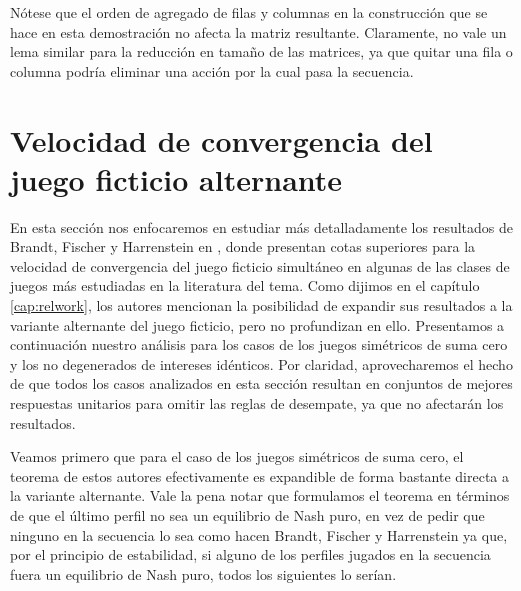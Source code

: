 Nótese que el orden de agregado de filas y columnas en la construcción que se hace en esta demostración no afecta la matriz resultante. Claramente, no vale un lema similar para la reducción en tamaño de las matrices, ya que quitar una fila o columna podría eliminar una acción por la cual pasa la secuencia.


\section{Velocidad de convergencia del juego ficticio alternante} \label{sec:aportes:velocidad}

En esta sección nos enfocaremos en estudiar más detalladamente los resultados de Brandt, Fischer y Harrenstein en \cite{brandt:rate:convergence}, donde presentan cotas superiores para la velocidad de convergencia del juego ficticio simultáneo en algunas de las clases de juegos más estudiadas en la literatura del tema. Como dijimos en el capítulo \ref{cap:relwork}, los autores mencionan la posibilidad de expandir sus resultados a la variante alternante del juego ficticio, pero no profundizan en ello. Presentamos a continuación nuestro análisis para los casos de los juegos simétricos de suma cero y los no degenerados de intereses idénticos. Por claridad, aprovecharemos el hecho de que todos los casos analizados en esta sección resultan en conjuntos de mejores respuestas unitarios para omitir las reglas de desempate, ya que no afectarán los resultados.

Veamos primero que para el caso de los juegos simétricos de suma cero, el teorema de estos autores efectivamente es expandible de forma bastante directa a la variante alternante. Vale la pena notar que formulamos el teorema en términos de que el último perfil no sea un equilibrio de Nash puro, en vez de pedir que ninguno en la secuencia lo sea como hacen Brandt, Fischer y Harrenstein ya que, por el principio de estabilidad, si alguno de los perfiles jugados en la secuencia fuera un equilibrio de Nash puro, todos los siguientes lo serían.

